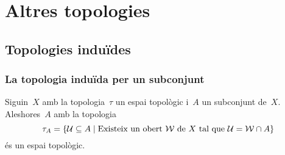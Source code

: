 \documentclass[../../main.tex]{subfiles}
\begin{document}
\chapter{Altres topologies}
\section{Topologies induïdes}
    \subsection{La topologia induïda per un subconjunt}
    \begin{proposition}
        \label{prop:topologia-induida-per-un-subconjunt}
        Siguin~\(X\) amb la topologia~\(\tau\) un espai topològic i~\(A\) un subconjunt de~\(X\).
        Aleshores~\(A\) amb la topologia
        \begin{equation}
            \label{prop:topologia-induida-per-un-subconjunt:eq1}
            \tau_{A}=\{\mathcal{U}\subseteq A\mid\text{Existeix un obert }\mathcal{W}\text{ de }X\text{ tal que }\mathcal{U}=\mathcal{W}\cap A\}
        \end{equation}
        és un espai topològic.
    \end{proposition}
\end{document}
